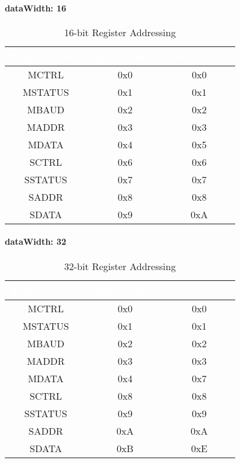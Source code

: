 \paragraph{dataWidth: 16}
\begin{table}[H]
  \centering
  \begin{tabular}{|c|c|c|}
    \hline
    \rowcolor{darkgray}  %
    \textcolor{white}{\textbf{Register Name}} & \textcolor{white}{\textbf{Address Start}} & \textcolor{white}{\textbf{Address End}} \\ \hline
    MCTRL & 0x0 & 0x0 \\ \hline
    MSTATUS & 0x1 & 0x1 \\ \hline
    MBAUD & 0x2 & 0x2 \\ \hline
    MADDR & 0x3 & 0x3 \\ \hline
    MDATA & 0x4 & 0x5 \\ \hline
    SCTRL & 0x6 & 0x6 \\ \hline
    SSTATUS & 0x7 & 0x7 \\ \hline
    SADDR & 0x8 & 0x8 \\ \hline
    SDATA & 0x9 & 0xA \\ \hline
  \end{tabular}
  \caption{16-bit Register Addressing}
\end{table}

\paragraph{dataWidth: 32}
\begin{table}[H]
  \centering
  \begin{tabular}{|c|c|c|}
    \hline
    \rowcolor{darkgray}  %
    \textcolor{white}{\textbf{Register Name}} & \textcolor{white}{\textbf{Address Start}} & \textcolor{white}{\textbf{Address End}} \\ \hline
    MCTRL & 0x0 & 0x0 \\ \hline
    MSTATUS & 0x1 & 0x1 \\ \hline
    MBAUD & 0x2 & 0x2 \\ \hline
    MADDR & 0x3 & 0x3 \\ \hline
    MDATA & 0x4 & 0x7 \\ \hline
    SCTRL & 0x8 & 0x8 \\ \hline
    SSTATUS & 0x9 & 0x9 \\ \hline
    SADDR & 0xA & 0xA \\ \hline
    SDATA & 0xB & 0xE \\ \hline
  \end{tabular}
  \caption{32-bit Register Addressing}
\end{table}